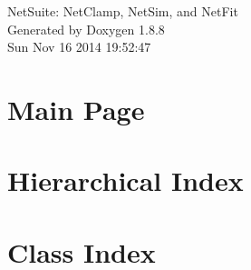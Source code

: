 \documentclass[twoside]{book}
\newcommand{\+}{\discretionary{\mbox{\scriptsize$\hookleftarrow$}}{}{}}
\newcommand{\clearemptydoublepage}{%
  \newpage{\pagestyle{empty}\cleardoublepage}%
}
\begin{document}
\hypersetup{pageanchor=false,
             bookmarks=true,
             bookmarksnumbered=true,
             pdfencoding=unicode
            }
\begin{titlepage}
\vspace*{7cm}
\begin{center}%
{\Large Net\+Suite\+: Net\+Clamp, Net\+Sim, and Net\+Fit }\\
\vspace*{1cm}
{\large Generated by Doxygen 1.8.8}\\
\vspace*{0.5cm}
{\small Sun Nov 16 2014 19:52:47}\\
\end{center}
\end{titlepage}
\clearemptydoublepage
\tableofcontents
\clearemptydoublepage
{}
\hypersetup{pageanchor=true}

\chapter{Main Page}
\label{index}\hypertarget{index}{}
\chapter{Hierarchical Index}

\chapter{Class Index}

\end{document}
